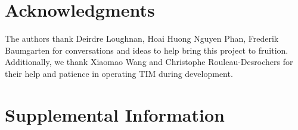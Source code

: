 \documentclass[a4paper,12pt]{article}
\begin{document}


\section{Acknowledgments}
The authors thank Deirdre Loughnan, Hoai Huong Nguyen Phan, Frederik Baumgarten for conversations and ideas to help bring this project to fruition. Additionally, we thank Xiaomao Wang and Christophe Rouleau-Desrochers for their help and patience in operating TIM during development. 

\section{Supplemental Information}
\end{document}
